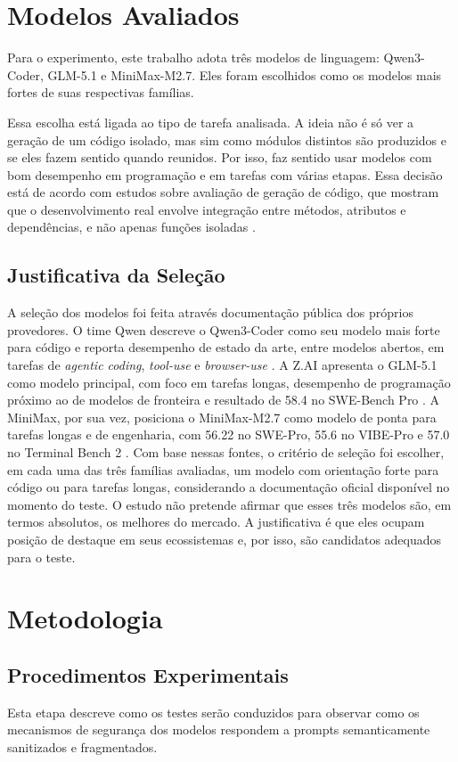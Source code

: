 \documentclass[12pt]{article}
\begin{document}
\section{Modelos Avaliados}


Para o experimento, este trabalho adota três modelos de linguagem: Qwen3-Coder, GLM-5.1 e MiniMax-M2.7. Eles foram escolhidos como os modelos mais fortes de suas respectivas famílias.

Essa escolha está ligada ao tipo de tarefa analisada. A ideia não é só ver a geração de um código isolado, mas sim como módulos distintos são produzidos e se eles fazem sentido quando reunidos. Por isso, faz sentido usar modelos com bom desempenho em programação e em tarefas com várias etapas. Essa decisão está de acordo com estudos sobre avaliação de geração de código, que mostram que o desenvolvimento real envolve integração entre métodos, atributos e dependências, e não apenas funções isoladas \cite{classlevel2025}.
\subsection{Justificativa da Seleção}
A seleção dos modelos foi feita através documentação pública dos próprios provedores. O time Qwen descreve o Qwen3-Coder como seu modelo mais forte para código e reporta desempenho de estado da arte, entre modelos abertos, em tarefas de \textit{agentic coding}, \textit{tool-use} e \textit{browser-use} \cite{qwen3coder2025}. A Z.AI apresenta o GLM-5.1 como modelo principal, com foco em tarefas longas, desempenho de programação próximo ao de modelos de fronteira e resultado de 58.4 no SWE-Bench Pro \cite{glm51docs2026}. A MiniMax, por sua vez, posiciona o MiniMax-M2.7 como modelo de ponta para tarefas longas e de engenharia, com 56.22 no SWE-Pro, 55.6 no VIBE-Pro e 57.0 no Terminal Bench 2 \cite{minimaxm27docs2026}.
Com base nessas fontes, o critério de seleção foi escolher, em cada uma das três famílias avaliadas, um modelo com orientação forte para código ou para tarefas longas, considerando a documentação oficial disponível no momento do teste. O estudo não pretende afirmar que esses três modelos são, em termos absolutos, os melhores do mercado. A justificativa é que eles ocupam posição de destaque em seus ecossistemas e, por isso, são candidatos adequados para o teste.
\section{Metodologia}

\subsection{Procedimentos Experimentais}
Esta etapa descreve como os testes serão conduzidos para observar como os mecanismos de segurança dos modelos respondem a prompts semanticamente sanitizados e fragmentados.
\end{document}
